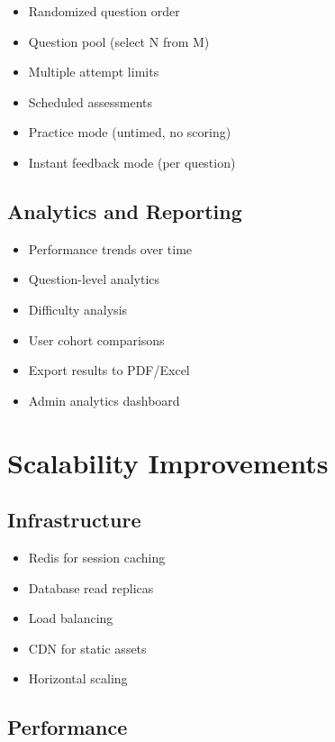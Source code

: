 \documentclass[12pt,a4paper]{report}
\begin{document}
\begin{itemize}
    \item Randomized question order
    \item Question pool (select N from M)
    \item Multiple attempt limits
    \item Scheduled assessments
    \item Practice mode (untimed, no scoring)
    \item Instant feedback mode (per question)
\end{itemize}

\subsection{Analytics and Reporting}

\begin{itemize}
    \item Performance trends over time
    \item Question-level analytics
    \item Difficulty analysis
    \item User cohort comparisons
    \item Export results to PDF/Excel
    \item Admin analytics dashboard
\end{itemize}

\section{Scalability Improvements}

\subsection{Infrastructure}

\begin{itemize}
    \item Redis for session caching
    \item Database read replicas
    \item Load balancing
    \item CDN for static assets
    \item Horizontal scaling
\end{itemize}

\subsection{Performance}
\end{document}
